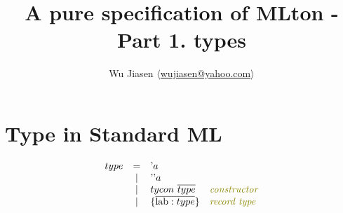 \documentclass[11pt,a4paper]{article}
\newcommand{\nbkey}[1]{\textrm{#1}}
\newcommand{\lab}{\nbkey{lab}}
\newcommand{\comment}[1]{\textit{\color{olive}#1}}
\newcommand{\braced}[1]{\{#1\}}
\newcommand{\vect}[1]{\overline{#1}}
\begin{document}
\title {A pure specification of MLton - Part 1. types}
\author{Wu Jiasen $\langle$\href{mailto:wujiasen@yahoo.com}{wujiasen@yahoo.com}$\rangle$}
\maketitle 
\thispagestyle{fancy}

\section{Type in Standard ML}
\newcommand{\q}     {\textrm{'}}
\newcommand{\Env}   {\textrm{E}}
\newcommand{\vdashT}{\ \vdash_{\textrm{\tiny T}}\  }
\newcommand{\inTE}  {\ \in^{\textrm{\tiny TE}}\  }
\[\begin{array}{lcll}
type & = & \q a                                             & \\
     & | & \q\q a                                           & \\
     & | & tycon\ \vect{type}              	            	&\comment{constructor}\\
     & | & \braced{\vect{\lab:type}}       		        	&\comment{record type}\\
\end{array}\]
\end{document}
